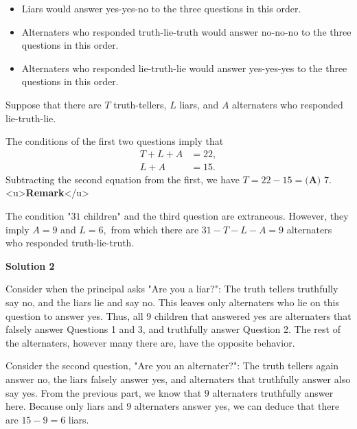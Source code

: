 \begin{enumerate}
            \begin{itemize}
        \item Liars would answer yes-yes-no to the three questions in this order.
            \end{itemize}
            
            \begin{itemize}
        \item Alternaters who responded truth-lie-truth would answer no-no-no to the three questions in this order.
            \end{itemize}
            
            \begin{itemize}
        \item Alternaters who responded lie-truth-lie would answer yes-yes-yes to the three questions in this order.
            \end{itemize}
            Suppose that there are $T$ truth-tellers, $L$ liars, and $A$ alternaters who responded lie-truth-lie.

 The conditions of the first two questions imply that
 \begin{align*} T+L+A&=22, \\ L+A&=15. \end{align*}
Subtracting the second equation from the first, we have $T=22-15=\boxed{\textbf{(A) } 7}.$
<u>\textbf{Remark}</u>

 The condition "$31$ children" and the third question are extraneous. However, they imply $A=9$ and $L=6,$ from which there are $31-T-L-A=9$ alternaters who responded truth-lie-truth.

 



\textbf{Solution 2}

Consider when the principal asks "Are you a liar?": The truth tellers truthfully say no, and the liars lie and say no. This leaves only alternaters who lie on this question to answer yes. Thus, all $9$ children that answered yes are alternaters that falsely answer Questions 1 and 3, and truthfully answer Question 2. The rest of the alternaters, however many there are, have the opposite behavior.

 Consider the second question, "Are you an alternater?": The truth tellers again answer no, the liars falsely answer yes, and alternaters that truthfully answer also say yes. From the previous part, we know that $9$ alternaters truthfully answer here. Because only liars and $9$ alternaters answer yes, we can deduce that there are $15-9=6$ liars.


\end{enumerate}

